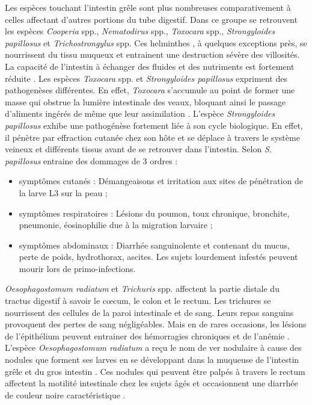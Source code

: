 \par Les espèces touchant l'intestin grêle sont plus nombreuses comparativement à 
celles affectant d'autres portions du tube digestif. Dans ce groupe se retrouvent 
les espèces \textit{Cooperia} spp., \textit{Nematodirus} spp., \textit{Toxocara} spp., 
\textit{Strongyloides papillosus} et \textit{Trichostrongylus} spp. Ces helminthes , 
à quelques exceptions près, se nourrissent du tissu muqueux et entrainent une destruction 
sévère des villosités. La capacité de l'intestin à échanger des fluides et des nutriments 
est fortement réduite . Les espèces \textit{Toxocara} spp. et 
\textit{Strongyloides papillosus} expriment des pathogenèses différentes. En effet,  
\textit{Toxocara} s'accumule au point de former une masse qui obstrue la lumière 
intestinale des veaux, bloquant ainsi le passage d'aliments ingérés de même que 
leur assimilation . L'espèce \textit{Strongyloides papillosus} 
exhibe une pathogénèse fortement liée à son cycle biologique. En effet, il pénètre 
par effraction cutanée chez son hôte et se déplace à travers le système veineux et 
différents tissus avant de se retrouver dans l'intestin.
Selon  \textit{S. papillosus} entraine des dommages de 3 ordres :
\begin{itemize}
	\item symptômes cutanés : Démangeaisons et irritation aux sites de pénétration de 
	la larve L3 sur la peau ;
	\item symptômes respiratoires : Lésions du poumon, toux chronique, bronchite, 
	pneumonie, éosinophilie due à la migration larvaire ;
	\item symptômes abdominaux : Diarrhée sanguinolente et contenant du mucus, perte 
	de poids, hydrothorax, ascites. Les sujets lourdement infestés peuvent mourir lors de
	primo-infections.
\end{itemize}

\par \textit{Oesophagostomum radiatum} et \textit{Trichuris} spp. affectent la partie 
distale du tractus digestif à savoir le c\oe cum, le colon et le rectum. Les trichures 
se nourrissent des cellules de la paroi intestinale et de sang. Leurs repas sanguins 
provoquent des pertes de sang négligéables. Mais en de rares occasions, les lésions de 
l'épithélium peuvent entrainer des hémorragies chroniques et de l'anémie . 
L'espèce \textit{Oesophagostomum radiatum} a reçu le nom de ver nodulaire à cause des 
nodules que forment ses larves en se développant dans la muqueuse de l'intestin grêle et 
du gros intestin . Ces nodules qui peuvent être palpés à travers le 
rectum affectent la motilité intestinale chez les sujets âgés et occasionnent une 
diarrhée de couleur noire caractéristique .

